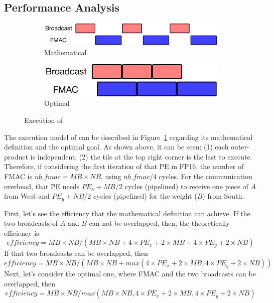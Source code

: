 \subsection{Performance Analysis}


\begin{figure}[t!]
  \centering
  \begin{subfigure}{0.48\columnwidth}
    \includegraphics[width=\linewidth]{figures/gemm_A_C_memory_summa/3.pdf}
    \caption{Mathematical}
  \end{subfigure}
  \hfill
  \begin{subfigure}{0.48\columnwidth}
    \includegraphics[width=\linewidth]{figures/gemm_A_C_memory_summa/4.pdf}
    \caption{Optimal}
  \end{subfigure}
  \caption{Execution of \summa}
  \label{fig:gemm_summa_3_4}
\end{figure}


The execution model of \summa can be described in Figure~\ref{fig:gemm_summa_3_4} regarding its mathematical definition and the optimal goal.
%
As shown above, it can be seen: (1) each outer-product is independent; (2) the tile at the top right corner is the last to execute.
%
Therefore, if considering the first iteration of that PE in FP16, the number of FMAC is $nb\_fmac = MB \times NB$, using $nb\_fmac/4$ cycles.
%
For the communication overhead, that PE needs $PE_x + MB/2$ cycles (pipelined) to receive one piece of $A$ from West and $PE_y + NB/2$ cycles (pipelined) for the weight ($B$) from South.


First, let's see the efficiency that the mathematical definition can achieve.
%
If the two broadcasts of $A$ and $B$ can not be overlapped, then, the theoretically efficiency is 
\begin{equation}
  efficiency = MB \times NB/(MB \times NB+4 \times PE_x + 2 \times MB+4 \times PE_y + 2 \times NB)
  \label{eq:summa_1}
\end{equation}
%
If that two broadcasts can be overlapped, then
\begin{equation}
  efficiency= MB \times NB/(MB \times NB+max(4 \times PE_x + 2 \times MB, 4 \times PE_y + 2 \times NB))
  \label{eq:summa_2}
\end{equation}
%
Next, let's consider the optimal one, where FMAC and the two broadcasts can be overlapped, then
\begin{equation}
  efficiency = MB \times NB/max(MB \times NB, 4 \times PE_x + 2 \times MB, 4 \times PE_y + 2 \times NB)
  \label{eq:summa_3}
\end{equation}





